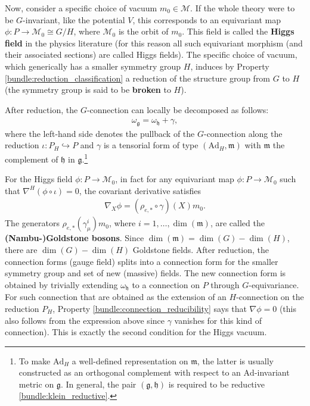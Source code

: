     Now, consider a specific choice of vacuum $m_0\in\mathcal{M}$. If the whole theory were to be $G$-invariant, like the potential $V$, this corresponds to an equivariant map $\phi:P\rightarrow \mathcal{M}_0\cong G/H$, where $\mathcal{M}_0$ is the orbit of $m_0$. This field is called the \textbf{Higgs field} in the physics literature (for this reason all such equivariant morphism (and their associated sections) are called Higgs fields). The specific choice of vacuum, which generically has a smaller symmetry group $H$, induces by Property \ref{bundle:reduction_classification} a reduction of the structure group from $G$ to $H$ (the symmetry group is said to be \textbf{broken} to $H$).

    After reduction, the $G$-connection can locally be decomposed as follows:
    \begin{gather}
        \omega_\mathfrak{g} = \omega_\mathfrak{h} + \gamma,
    \end{gather}
    where the left-hand side denotes the pullback of the $G$-connection along the reduction $\iota:P_H\hookrightarrow P$ and $\gamma$ is a tensorial form of type $(\mathrm{Ad}_H,\mathfrak{m})$ with $\mathfrak{m}$ the complement of $\mathfrak{h}$ in $\mathfrak{g}$.\footnote{To make $\mathrm{Ad}_H$ a well-defined representation on $\mathfrak{m}$, the latter is usually constructed as an orthogonal complement with respect to an $\mathrm{Ad}$-invariant metric on $\mathfrak{g}$. In general, the pair $(\mathfrak{g},\mathfrak{h})$ is required to be reductive \ref{bundle:klein_reductive}.}

    For the Higgs field $\phi:P\rightarrow\mathcal{M}_0$, in fact for any equivariant map $\phi:P\rightarrow\mathcal{M}_0$ such that $\nabla^H(\phi\circ\iota)=0$, the covariant derivative satisfies
    \begin{gather}
        \nabla_X\phi = (\rho_{e,\ast}\circ\gamma)(X)m_0.
    \end{gather}
    The generators $\rho_{e,\ast}(\gamma^i_\mu)m_0$, where $i=1,\ldots,\dim(\mathfrak{m})$, are called the \textbf{(Nambu-)Goldstone bosons}. Since $\dim(\mathfrak{m})=\dim(G)-\dim(H)$, there are $\dim(G)-\dim(H)$ Goldstone fields. After reduction, the connection forms (gauge field) splits into a connection form for the smaller symmetry group and set of new (massive) fields. The new connection form is obtained by trivially extending $\omega_\mathfrak{h}$ to a connection on $P$ through $G$-equivariance. For such connection that are obtained as the extension of an $H$-connection on the reduction $P_H$, Property \ref{bundle:connection_reducibility} says that $\nabla\phi=0$ (this also follows from the expression above since $\gamma$ vanishes for this kind of connection). This is exactly the second condition for the Higgs vacuum.